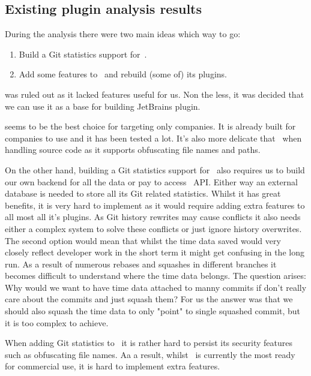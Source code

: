 \subsection{Existing plugin analysis results}\label{subsec:existing-plugin-analysis-results}
During the analysis there were two main ideas which way to go:
\begin{enumerate}
    \item Build a Git statistics support for~.
    \item Add some features to~ and rebuild (some of) its plugins.
\end{enumerate}

 was ruled out as it lacked features useful for us.
Non the less, it was decided that we can use it as a base for building JetBrains plugin.

 seems to be the best choice for targeting only companies.
It is already built for companies to use and it has been tested a lot.
It's also more delicate that~ when handling source code as it supports obfuscating file names and paths.

On the other hand, building a Git statistics support for~ also requires us to build our own backend
for all the data or pay to access~ API.
Either way an external database is needed to store all its Git related statistics.
Whilst it has great benefits, it is very hard to implement as it would require adding extra features to all most all it's plugins.
As Git history rewrites may cause conflicts it also needs either a complex system to solve these conflicts or just ignore history overwrites.
The second option would mean that whilst the time data saved would very closely reflect developer work in the short term it might get
confusing in the long run.
As a result of numerous rebases and squashes in different branches it becomes difficult to understand where the time data belongs.
The question arises: Why would we want to have time data attached to manny commits if don't really care about the commits and just squash them?
For us the answer was that we should also squash the time data to only "point" to single squashed commit, but it is too complex to achieve.

When adding Git statistics to~ it is rather hard to persist its security features such as obfuscating file names.
Aa a result, whilst~ is currently the most ready for commercial use, it is hard to implement extra features.

